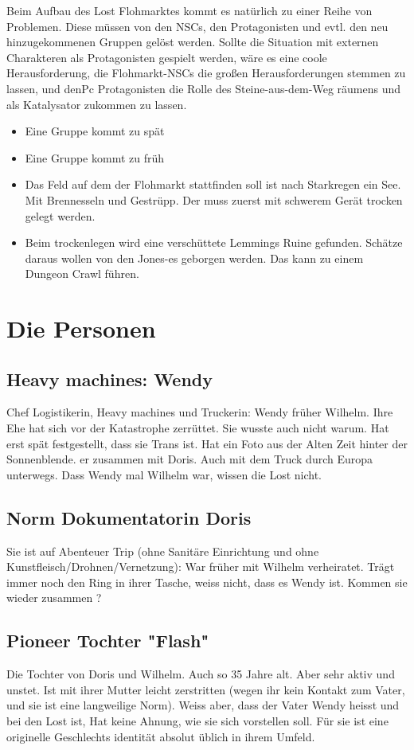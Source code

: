 \documentclass{book}
\begin{document}
Beim Aufbau des Lost Flohmarktes kommt es natürlich zu einer Reihe von Problemen. Diese müssen von den NSCs, den Protagonisten und evtl. den neu hinzugekommenen Gruppen gelöst werden. Sollte die Situation mit externen Charakteren als Protagonisten gespielt werden, wäre es eine coole Herausforderung, die Flohmarkt-NSCs die großen Herausforderungen stemmen zu lassen, und denPc Protagonisten die Rolle des Steine-aus-dem-Weg räumens und als Katalysator zukommen zu lassen.

\begin{itemize}
\item Eine Gruppe kommt zu spät
\item Eine Gruppe kommt zu früh
\item Das Feld auf dem der Flohmarkt stattfinden soll ist nach Starkregen ein See. Mit Brennesseln und Gestrüpp. Der muss zuerst mit schwerem Gerät trocken gelegt werden.
\item Beim trockenlegen wird eine verschüttete Lemmings Ruine gefunden. Schätze daraus wollen von den Jones-es geborgen werden. Das kann zu einem Dungeon Crawl führen.
\end{itemize}

\chapter{Die Personen}

\section{Heavy machines: Wendy}

Chef Logistikerin, Heavy machines und Truckerin: Wendy früher Wilhelm. Ihre Ehe hat sich vor der Katastrophe zerrüttet. Sie wusste auch nicht warum. Hat erst spät festgestellt, dass sie Trans ist. Hat ein Foto aus der Alten Zeit hinter der Sonnenblende. er zusammen mit Doris. Auch mit dem Truck durch Europa unterwegs. Dass Wendy mal Wilhelm war, wissen die Lost nicht.

\section{Norm Dokumentatorin Doris}
Sie ist auf Abenteuer Trip (ohne Sanitäre Einrichtung und ohne Kunstfleisch/Drohnen/Vernetzung): War früher mit Wilhelm verheiratet. Trägt immer noch den Ring in ihrer Tasche, weiss nicht, dass es Wendy ist. Kommen sie wieder zusammen ?

\section{Pioneer Tochter "Flash"}
Die Tochter von Doris und Wilhelm. Auch so 35 Jahre alt. Aber sehr aktiv und unstet. Ist mit ihrer Mutter leicht zerstritten (wegen ihr kein Kontakt zum Vater, und sie ist eine langweilige Norm). Weiss aber, dass der Vater Wendy heisst und bei den Lost ist, Hat keine Ahnung, wie sie sich vorstellen soll. Für sie ist eine originelle Geschlechts identität absolut üblich in ihrem Umfeld.
\end{document}
